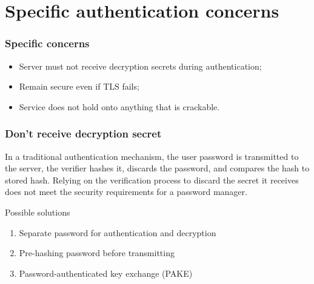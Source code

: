 \documentclass[xcolor={dvipsnames,table,hyperref}]{beamer}
\begin{document}
\section{Specific authentication concerns}

\begin{frame}
  \frametitle{Specific concerns}
  \begin{itemize}
    \item Server must not receive decryption secrets during authentication;
    \item Remain secure even if TLS fails;
    \item Service does not hold onto anything that is crackable.
  \end{itemize}

\end{frame}

\begin{frame}
  \frametitle{Don't receive decryption secret}
  In a traditional authentication mechanism, the user password is transmitted
  to the server, the verifier hashes it, discards the password, and compares the hash to stored hash. Relying on the verification process to discard the secret it receives does not meet the security requirements for a password
  manager.

  Possible solutions
  \begin{enumerate}
    \item Separate password for authentication and decryption
    \item Pre-hashing password before transmitting
    \item Password-authenticated key exchange (PAKE)
  \end{enumerate}
\end{frame}
\end{document}
